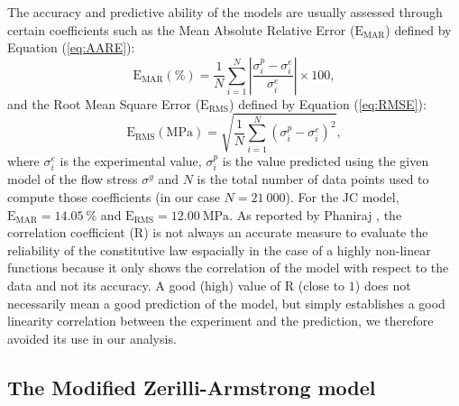 \documentclass[metals,article,submit,pdftex,moreauthors]{Definitions/mdpi}
\DeclareRobustCommand{\RMSE}{\text{E}_\text{RMS}}
\DeclareRobustCommand{\MARE}{\text{E}_\text{MAR}}
\DeclareRobustCommand{\R}{\text{R}}
\DeclareRobustCommand{\MPa}{\text{MPa}}
\begin{document}
The accuracy and predictive ability of the models are usually assessed through certain coefficients such as the Mean Absolute Relative Error ($\MARE$) defined by Equation (\ref{eq:AARE}):
\begin{equation}
\MARE(\%) = \frac{1}{N} \sum_{i=1}^{N}{\left|\frac{\sigma_i^p -\sigma_i^e}{\sigma_i^e}\right|} \times 100, \label{eq:AARE}
\end{equation}
and the Root Mean Square Error ($\RMSE$) defined by Equation (\ref{eq:RMSE}):
\begin{equation}
\RMSE (\MPa) = \sqrt{\frac{1}{N} \sum_{i=1}^{N} \left(\sigma_i^p - \sigma_i^e\right)^2}, \label{eq:RMSE}
\end{equation}
where $\sigma_i^e$ is the experimental value, $\sigma_i^p$ is the value predicted using the given model of the flow stress $\sigma^y$ and $N$ is the total number of data points used to compute those coefficients (in our case $N=21~000$).
For the JC model, $\MARE=14.05~\%$ and $\RMSE=12.00~\MPa$.
As reported by Phaniraj \cite{Phaniraj-2003}, the correlation coefficient ($\R$) is not always an accurate measure to evaluate the reliability of the constitutive law espacially in the case of a highly non-linear functions because it only shows the correlation of the model with respect to the data and not its accuracy.
A good (high) value of $\R$ (close to $1$) does not necessarily mean a good prediction of the model, but simply establishes a good linearity correlation between the experiment and the prediction, we therefore avoided its use in our analysis.

\subsection{The Modified Zerilli-Armstrong model\label{sec:MZA}}
\end{document}
